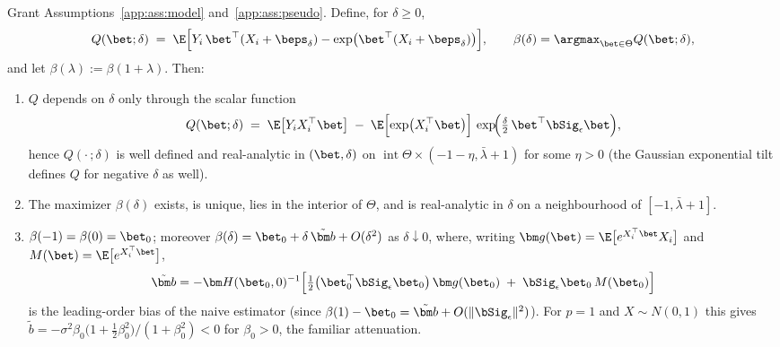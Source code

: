 \begin{lemma}\label{app:lem:curve}
Grant Assumptions~\ref{app:ass:model} and~\ref{app:ass:pseudo}. Define, for
$\delta\ge 0$,
\begin{equation}\label{app:eq:popobj}
  Q(\bet;\delta)
  \;=\; \E\Bigl[Y_i\,\bet^\top(X_i+\beps_\delta)
      -\exp\bigl(\bet^\top(X_i+\beps_\delta)\bigr)\Bigr],
  \qquad
  \beta(\delta)=\argmax_{\bet\in\Theta}Q(\bet;\delta),
\end{equation}
and let $\beta(\lambda):=\beta(1+\lambda)$. Then:
\begin{enumerate}\itemsep2pt
\item[(i)] $Q$ depends on $\delta$ only through the scalar function
      \[
        Q(\bet;\delta)\;=\;\E\bigl[Y_iX_i^\top\bet\bigr]
        \;-\;\E\Bigl[\exp\bigl(X_i^\top\bet\bigr)\Bigr]\,
        \exp\!\Bigl(\tfrac{\delta}{2}\,\bet^\top\bSig_\epsilon\bet\Bigr),
      \]
      hence $Q(\cdot\,;\delta)$ is well defined and real-analytic in
      $(\bet,\delta)$ on $\operatorname{int}\Theta\times(-1-\eta,\bar\lambda+1)$
      for some $\eta>0$ (the Gaussian exponential tilt defines $Q$ for
      negative $\delta$ as well).
\item[(ii)] The maximizer $\beta(\delta)$ exists, is unique, lies in the
      interior of $\Theta$, and is real-analytic in $\delta$ on a
      neighbourhood of $[-1,\bar\lambda+1]$.
\item[(iii)] $\beta(-1)=\beta(0)=\bet_0$; moreover
      $\beta(\delta)=\bet_0+\delta\,\tilde{\bm b}+O(\delta^2)$ as
      $\delta\downarrow 0$, where, writing
      $\bm g(\bet)=\E\bigl[e^{X_i^\top\bet}X_i\bigr]$ and
      $M(\bet)=\E\bigl[e^{X_i^\top\bet}\bigr]$,
      \begin{equation}\label{app:eq:bias1}
        \tilde{\bm b}
        =-\bm H(\bet_0,0)^{-1}\Bigl[
          \tfrac12\bigl(\bet_0^\top\bSig_\epsilon\bet_0\bigr)\,
          \bm g(\bet_0)\;+\;\bSig_\epsilon\bet_0\,M(\bet_0)
        \Bigr]
      \end{equation}
      is the leading-order bias of the naive estimator (since
      $\beta(1)-\bet_0=\tilde{\bm b}+O(\|\bSig_\epsilon\|^2)$). For
      $p=1$ and $X\sim N(0,1)$ this gives
      $\tilde b=-\sigma^2\beta_0\bigl(1+\tfrac12\beta_0^2\bigr)
      /(1+\beta_0^2)<0$ for $\beta_0>0$, the familiar attenuation.
\end{enumerate}
\end{lemma}

